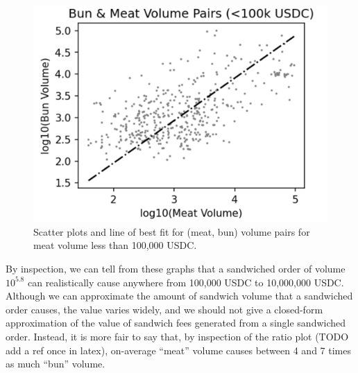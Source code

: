         \begin{figure}
            \label{fig:meat-bun-pairplot-small}
            \centering
            \includegraphics[scale=.43]{figs/meat-and-bun-pairwise-small-meat.png}
            \caption{Scatter plots and line of best fit for (meat, bun) volume pairs for meat volume less than 100,000 USDC.}
        \end{figure}
        

        By inspection, we can tell from these graphs that a sandwiched order of volume $10^{5.8}$ can realistically cause anywhere from 100,000 USDC to 10,000,000 USDC. Although we can approximate the amount of sandwich volume that a sandwiched order causes, the value varies widely, and we should not give a closed-form approximation of the value of sandwich fees generated from a single sandwiched order. Instead, it is more fair to say that, by inspection of the ratio plot (TODO add a ref once in latex), on-average  ``meat'' volume causes between 4 and 7 times as much ``bun'' volume.












































